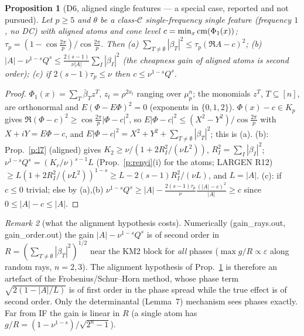\documentclass[11pt]{article}
\newtheorem{proposition}{Proposition}[section]\newtheorem{lemma}[proposition]{Lemma}\newtheorem{corollary}[proposition]{Corollary}
\theoremstyle{remark}\newtheorem{remark}[proposition]{Remark}
\begin{document}
\begin{proposition}[D6, aligned single features --- a special case, reported and not pursued]\label{p:al}
Let $p\ge5$ and $\theta$ be a class-$\mathcal C$ single-frequency single feature (frequency $1$, no DC) with aligned atoms and cone level
$c=\min_x\mathrm{cm}(\Phi_1(x))$; $\tau_p=(1-\cos\frac{2\pi}p)/\cos\frac{2\pi}p$. Then (a) $\sum_{T\ne\emptyset}|\beta_T|^2\le\tau_p(\Re A-c)^2$;
(b) $|A|-\nu^{1-s}Q^s\le\frac{2(s-1)}{\nu|A|}\sum_I|\beta_I|^2$ (the cheapness gain of aligned atoms is second order); (c) if $2(s-1)\tau_p\le\nu$ then $c\le\nu^{1-s}Q^s$.
\end{proposition}
\begin{proof}
$\Phi_1(x)=\sum_T\bar\beta_Tz^T$, $z_t=\rho^{2x_t}$ ranging over $\mu_p^n$; the monomials $z^T$, $T\subseteq[n]$, are orthonormal and $E(\Phi-E\Phi)^2=0$ (exponents in
$\{0,1,2\}$). $\Phi(x)-c\in K_p$ gives $\Re(\Phi-c)^2\ge\cos\frac{2\pi}p|\Phi-c|^2$, so $E|\Phi-c|^2\le(X^2-Y^2)/\cos\frac{2\pi}p$ with $X+iY=E\Phi-c$, and
$E|\Phi-c|^2=X^2+Y^2+\sum_{T\ne\emptyset}|\beta_T|^2$; this is (a). (b): Prop.~\ref{p:l7} (aligned) gives $K_2\ge\nu/(1+2R_I^2/(\nu L^2))$,
$R_I^2=\sum_I|\beta_I|^2$; $\nu^{1-s}Q^s=(K_r/\nu)^{s-1}L$ (Prop.~\ref{p:renyi}(i) for the atoms; LARGEN R12) $\ge L(1+2R_I^2/(\nu L^2))^{1-s}\ge L-2(s-1)R_I^2/(\nu L)$, and $L=|A|$.
(c): if $c\le0$ trivial; else by (a),(b) $\nu^{1-s}Q^s\ge|A|-\frac{2(s-1)\tau_p}{\nu}\frac{(|A|-c)^2}{|A|}\ge c$ since $0\le|A|-c\le|A|$.
\end{proof}

\begin{remark}[what the alignment hypothesis costs]
Numerically (gain\_rays.out, gain\_order.out) the gain $|A|-\nu^{1-s}Q^s$ is of second order in $R=(\sum_{T\ne\emptyset}|\beta_T|^2)^{1/2}$ near the KM2 block for
\emph{all} phases ($\max g/R\propto\varepsilon$ along random rays, $n=2,3$). The alignment hypothesis of Prop.~\ref{p:al} is therefore an artefact of the
Frobenius/Schur--Horn method, whose phase term $\sqrt{2(1-|A|/L)}$ is of first order in the phase spread while the true effect is of second order.
Only the determinantal (Lemma~7) mechanism sees phases exactly. Far from IF the gain is linear in $R$ (a single atom has $g/R=(1-\nu^{1-s})/\sqrt{2^n-1}$).
\end{remark}
\end{document}
